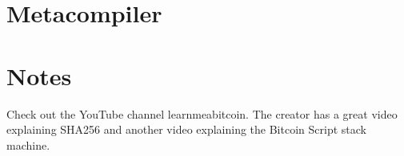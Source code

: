 %
\section{Metacompiler}


%
\section{Notes}
Check out the YouTube channel learnmeabitcoin. The creator has a great video explaining SHA256
and another video explaining the Bitcoin Script stack machine.



\begin{table}[htbp]
    \caption{Example interpretation of a Forth word. This table would be paired with a
    code listing for the word. A column can be added for the return stack or other information. 
    Exercises can be made in the style of fill-in-the-missing-item.}
    \label{tab:addlabel}%
\end{table}%






